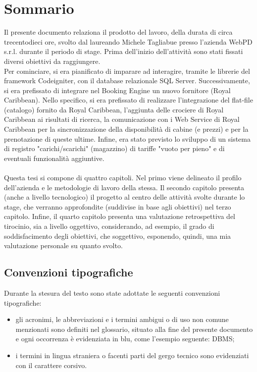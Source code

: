 
\cleardoublepage
{}
{}
\begingroup
\let\clearpage\relax
\let\cleardoublepage\relax
\let\cleardoublepage\relax

\chapter*{Sommario}

Il presente documento relaziona il prodotto del lavoro, della durata di circa trecentodieci ore, svolto dal laureando Michele Tagliabue presso l'azienda WebPD s.r.l. durante il periodo di stage. Prima dell'inizio dell'attività sono stati fissati diversi obiettivi da raggiungere.\\
Per cominciare, si era pianificato di imparare ad interagire, tramite le librerie del framework Codeigniter, con il database relazionale SQL Server. 
Successivamente, si era prefissato di integrare nel Booking Engine un nuovo fornitore (Royal Caribbean). Nello specifico, si era prefissato di realizzare l'integrazione del flat-file (catalogo) fornito da Royal Caribbean, l'aggiunta delle crociere di Royal Caribbean ai risultati di ricerca, la comunicazione con i Web Service di Royal Caribbean per la sincronizzazione della disponibilità di cabine (e prezzi) e per la prenotazione di queste ultime.
Infine, era stato previsto lo sviluppo di un sistema di registro "carichi/scarichi" (magazzino) di tariffe "vuoto per pieno" e di eventuali funzionalità aggiuntive.\\ \\
Questa tesi si compone di quattro capitoli. Nel primo viene delineato il profilo dell'azienda e le metodologie di lavoro della stessa. Il secondo capitolo presenta (anche a livello tecnologico) il progetto al centro delle attività svolte durante lo stage, che verranno approfondite (suddivise in base agli obiettivi) nel terzo capitolo. Infine, il quarto capitolo presenta una valutazione retrospettiva del tirocinio, sia a livello oggettivo, considerando, ad esempio, il grado di soddisfacimento degli obiettivi, che soggettivo, esponendo, quindi, una mia valutazione personale su quanto svolto.

\section*{Convenzioni tipografiche}
Durante la stesura del testo sono state adottate le seguenti convenzioni tipografiche:
\begin{itemize}
	\item gli acronimi, le abbreviazioni e i termini ambigui o di uso non comune menzionati
	sono definiti nel glossario, situato alla fine del presente documento e ogni
	occorrenza è evidenziata in blu, come l'esempio seguente: \gls{DBMS};
	\item i termini in lingua straniera o facenti parti del gergo tecnico sono evidenziati con
	il carattere corsivo.
\end{itemize}

